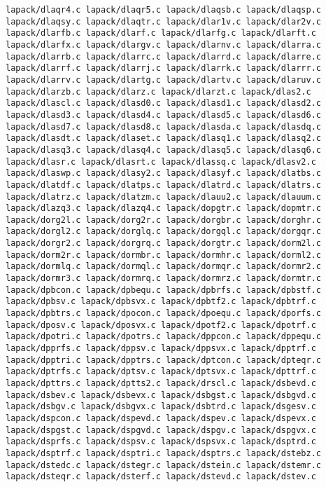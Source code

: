 \documentclass[10pt,a4paper]{article}
\begin{document}
\begin{codeparchment}
\begin{lstlisting}
lapack/dlaqr4.c lapack/dlaqr5.c lapack/dlaqsb.c lapack/dlaqsp.c 
lapack/dlaqsy.c lapack/dlaqtr.c lapack/dlar1v.c lapack/dlar2v.c 
lapack/dlarfb.c lapack/dlarf.c lapack/dlarfg.c lapack/dlarft.c 
lapack/dlarfx.c lapack/dlargv.c lapack/dlarnv.c lapack/dlarra.c 
lapack/dlarrb.c lapack/dlarrc.c lapack/dlarrd.c lapack/dlarre.c 
lapack/dlarrf.c lapack/dlarrj.c lapack/dlarrk.c lapack/dlarrr.c 
lapack/dlarrv.c lapack/dlartg.c lapack/dlartv.c lapack/dlaruv.c 
lapack/dlarzb.c lapack/dlarz.c lapack/dlarzt.c lapack/dlas2.c 
lapack/dlascl.c lapack/dlasd0.c lapack/dlasd1.c lapack/dlasd2.c 
lapack/dlasd3.c lapack/dlasd4.c lapack/dlasd5.c lapack/dlasd6.c 
lapack/dlasd7.c lapack/dlasd8.c lapack/dlasda.c lapack/dlasdq.c 
lapack/dlasdt.c lapack/dlaset.c lapack/dlasq1.c lapack/dlasq2.c 
lapack/dlasq3.c lapack/dlasq4.c lapack/dlasq5.c lapack/dlasq6.c 
lapack/dlasr.c lapack/dlasrt.c lapack/dlassq.c lapack/dlasv2.c 
lapack/dlaswp.c lapack/dlasy2.c lapack/dlasyf.c lapack/dlatbs.c 
lapack/dlatdf.c lapack/dlatps.c lapack/dlatrd.c lapack/dlatrs.c 
lapack/dlatrz.c lapack/dlatzm.c lapack/dlauu2.c lapack/dlauum.c 
lapack/dlazq3.c lapack/dlazq4.c lapack/dopgtr.c lapack/dopmtr.c 
lapack/dorg2l.c lapack/dorg2r.c lapack/dorgbr.c lapack/dorghr.c 
lapack/dorgl2.c lapack/dorglq.c lapack/dorgql.c lapack/dorgqr.c 
lapack/dorgr2.c lapack/dorgrq.c lapack/dorgtr.c lapack/dorm2l.c 
lapack/dorm2r.c lapack/dormbr.c lapack/dormhr.c lapack/dorml2.c 
lapack/dormlq.c lapack/dormql.c lapack/dormqr.c lapack/dormr2.c
lapack/dormr3.c lapack/dormrq.c lapack/dormrz.c lapack/dormtr.c 
lapack/dpbcon.c lapack/dpbequ.c lapack/dpbrfs.c lapack/dpbstf.c 
lapack/dpbsv.c lapack/dpbsvx.c lapack/dpbtf2.c lapack/dpbtrf.c 
lapack/dpbtrs.c lapack/dpocon.c lapack/dpoequ.c lapack/dporfs.c 
lapack/dposv.c lapack/dposvx.c lapack/dpotf2.c lapack/dpotrf.c 
lapack/dpotri.c lapack/dpotrs.c lapack/dppcon.c lapack/dppequ.c 
lapack/dpprfs.c lapack/dppsv.c lapack/dppsvx.c lapack/dpptrf.c 
lapack/dpptri.c lapack/dpptrs.c lapack/dptcon.c lapack/dpteqr.c 
lapack/dptrfs.c lapack/dptsv.c lapack/dptsvx.c lapack/dpttrf.c 
lapack/dpttrs.c lapack/dptts2.c lapack/drscl.c lapack/dsbevd.c 
lapack/dsbev.c lapack/dsbevx.c lapack/dsbgst.c lapack/dsbgvd.c 
lapack/dsbgv.c lapack/dsbgvx.c lapack/dsbtrd.c lapack/dsgesv.c 
lapack/dspcon.c lapack/dspevd.c lapack/dspev.c lapack/dspevx.c 
lapack/dspgst.c lapack/dspgvd.c lapack/dspgv.c lapack/dspgvx.c 
lapack/dsprfs.c lapack/dspsv.c lapack/dspsvx.c lapack/dsptrd.c 
lapack/dsptrf.c lapack/dsptri.c lapack/dsptrs.c lapack/dstebz.c 
lapack/dstedc.c lapack/dstegr.c lapack/dstein.c lapack/dstemr.c 
lapack/dsteqr.c lapack/dsterf.c lapack/dstevd.c lapack/dstev.c 

\end{lstlisting}
\end{codeparchment}
\end{document}

